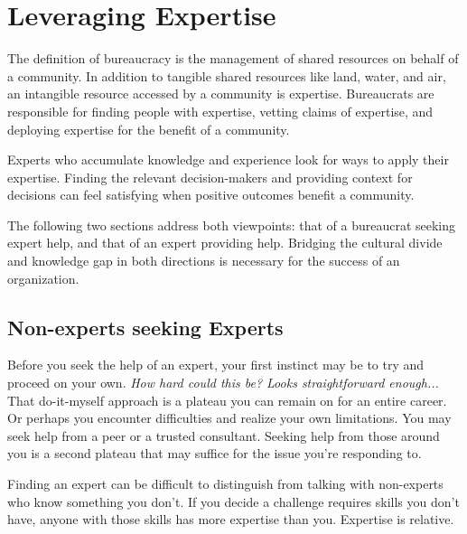 \section{Leveraging Expertise\label{sec:expertise}}



The definition of \gls{bureaucracy} is the management of shared resources on behalf of a community. In addition to tangible shared resources like land, water, and air, an intangible resource accessed by a community is expertise. Bureaucrats are responsible for finding people with expertise, vetting claims of expertise, and deploying expertise for the benefit of a community. 

Experts who accumulate knowledge and experience look for ways to apply their expertise. Finding the relevant decision-makers and providing context for decisions can feel satisfying when positive  outcomes benefit a community. 


The following two sections address both viewpoints: that of a bureaucrat seeking expert help, and that of an expert providing help. Bridging the cultural divide and knowledge gap in both directions is necessary for the success of an organization.

\subsection*{Non-experts seeking Experts}

Before you seek the help of an expert, your first instinct may be to try and proceed on your own. \textit{How hard could this be? Looks straightforward enough...} That do-it-myself approach is a plateau you can remain on for an entire career. Or perhaps you encounter difficulties and realize your own limitations. You may seek help from a peer or a trusted consultant. Seeking help from those around you is a second plateau that may suffice for the issue you're responding to. 

Finding an expert can be difficult to distinguish from talking with non-experts who know something you don't. If you decide a challenge requires skills you don't have, anyone with those skills has more expertise than you. Expertise is relative. 

